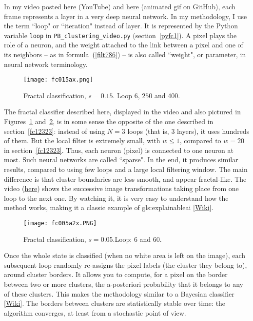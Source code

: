 \documentclass[oneside,10pt]{book}
\begin{document}
In my video posted \href{https://www.youtube.com/watch?v=dNPSEh-X6uw}{here} (YouTube) and \href{https://github.com/VincentGranville/Point-Processes/blob/main/Videos/fractal005.gif}{here} (animated gif on GitHub), each frame represents a layer in a \textcolor{index}{very deep neural network}. In my methodology, I use the term ``loop" or ``iteration" instead of layer. It is represented by the Python variable \texttt{loop} in \texttt{PB\_clustering\_video.py} (section~\ref{pyfc1}).
A pixel plays the role of a \textcolor{index}{neuron}, and the weight attached to the link between a pixel and one of its neighbors -- as in formula~(\ref{filt786}) --  is also called ``weight", or parameter, in neural network  terminology.  


\begin{figure}[H]
\centering
\texttt{[image: fc015ax.png]}
\caption{Fractal classification, $s=0.15$. Loop $6$, $250$ and $400$.}
\label{fc015a}
\end{figure}

The fractal classifier described here, displayed in the video and also pictured in Figures~\ref{fc015a} and~\ref{fc005a}, is in some sense the opposite of the one described in section~\ref{fc12323}: instead of using $N=3$ loops (that is, 3 layers), it uses hundreds of them. But the local filter is extremely small, with $w\leq1$, compared to $w=20$ in section~\ref{fc12323}. Thus, each neuron (pixel) is connected to one neuron at most. Such neural networks are called ``sparse". In the end, it produces similar results, compared to using few loops and a large local filtering window. The main difference is that cluster boundaries are less smooth, and appear fractal-like. The video (\href{https://github.com/VincentGranville/Point-Processes/blob/main/Videos/fractal005.gif}{here}) shows the successive image transformations taking place from one loop to the next one. By watching it, it is very easy to understand how the method works, making it a classic example of 
\gls{gls:explainableai} [\href{https://en.wikipedia.org/wiki/Explainable_artificial_intelligence}{Wiki}].

\begin{figure}[H]
\centering
\texttt{[image: fc005a2x.PNG]}
\caption{Fractal classification, $s=0.05$.Loop: $6$ and $60$.}
\label{fc005a}
\end{figure}

Once the whole state is classified  (when no white area is left on the image), each subsequent loop randomly re-assigns the pixel labels (the cluster they belong to), around cluster borders. It allows you to compute, for a pixel on the border between two or more clusters, the a-posteriori probability that it belongs to any of these clusters. This makes the methodology similar to a \textcolor{index}{Bayesian classifier} [\href{https://en.wikipedia.org/wiki/Bayes_classifier}{Wiki}]. The borders between clusters are statistically stable over time: the algorithm converges, at least from a stochastic point of view.
\end{document}
